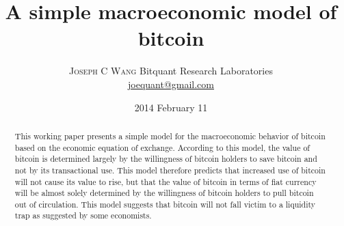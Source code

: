 \documentclass[twoside]{article}
\title{\vspace{-15mm}\fontsize{24pt}{10pt}\selectfont\textbf{A simple macroeconomic model of bitcoin}} %
\author{
\large
\textsc{Joseph C Wang}
\normalsize Bitquant Research Laboratories\\
\normalsize \href{mailto:joequant@gmail.com}{joequant@gmail.com}
\date{2014 February 11}
}
\begin{document}
\maketitle
\thispagestyle{fancy}
\begin{abstract}
This working paper presents a simple model for the macroeconomic
behavior of bitcoin based on the economic equation of exchange.
According to this model, the value of bitcoin is determined largely by
the willingness of bitcoin holders to save bitcoin and not by its
transactional use.  This model therefore predicts that increased use
of bitcoin will not cause its value to rise, but that the value of
bitcoin in terms of fiat currency will be almost solely determined by
the willingness of bitcoin holders to pull bitcoin out of circulation.
This model suggests that bitcoin will not fall victim to a liquidity
trap as suggested by some economists.
\end{abstract}
\end{document}
